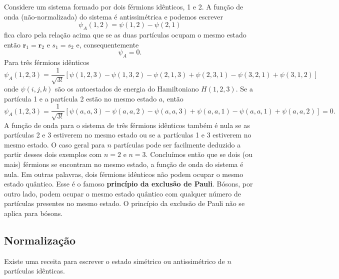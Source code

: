 \documentclass{article}
\begin{document}
Considere um sistema formado por dois férmions idênticos, 1 e 2. A função de onda (não-normalizada) do sistema é antissimétrica e podemos escrever
\begin{equation}
    \psi_A(1,2) = \psi(1,2) - \psi(2,1)
\end{equation}
fica claro pela relação acima que se as duas partículas ocupam o mesmo estado então $\mathbf{r}_1 = \mathbf{r}_2$ e $s_1 = s_2$ e, consequentemente
\begin{equation}
    \psi_A = 0.
\end{equation}
Para três férmions idênticos
\begin{equation}
    \psi_A(1,2,3) =\frac{1}{\sqrt{3!}}[\psi(1,2,3) - \psi(1,3,2) -\psi(2,1,3) + \psi(2,3,1) - \psi(3,2,1) + \psi(3,1,2)]
\end{equation}
onde $\psi(i,j,k)$ são os autoestados de energia do Hamiltoniano $H(1,2,3)$. Se a partícula 1 e a partícula 2 estão no mesmo estado $a$, então
\begin{equation}
    \psi_A(1,2,3) =\frac{1}{\sqrt{3!}}[\psi(a,a,3) - \psi(a,a,2) -\psi(a,a,3) + \psi(a,a,1) - \psi(a,a,1) + \psi(a,a,2)] = 0.
\end{equation}
A função de onda para o sistema de três férmions idênticos também é nula se as partículas 2 e 3 estiverem no mesmo estado ou se a partículas 1 e 3 estiverem no mesmo estado. O caso geral para $n$ partículas pode ser facilmente deduzido a partir desses dois exemplos com $n = 2$ e $n = 3$. Concluímos então que se dois (ou mais) férmions se encontram no mesmo estado, a função de onda do sistema é nula. Em outras palavras, dois férmions idênticos não podem ocupar o mesmo estado quântico. Esse é o famoso \textbf{princípio da exclusão de Pauli}. Bósons, por outro lado, podem ocupar o mesmo estado quântico com qualquer número de partículas presentes no mesmo estado. O princípio da exclusão de Pauli não se aplica para bósons.


\subsection{Normalização}

Existe uma receita para escrever o estado simétrico ou antissimétrico de $n$ partículas idênticas. 



\end{document}

